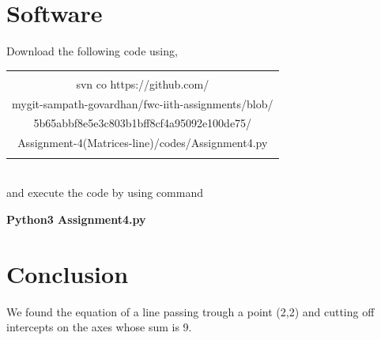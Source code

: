 \documentclass[journal,12pt,twocolumn]{IEEEtran}
\begin{document}
\section{Software}
Download the following code using,
\begin{table}[h]
    \centering
    \begin{tabular}{|c|}
    \hline \\
         svn co https://github.com/\\mygit-sampath-govardhan/fwc-iith-assignments/blob/\\5b65abbf8e5e3c803b1bff8cf4a95092e100de75/\\Assignment-4(Matrices-line)/codes/Assignment4.py  \\
         \\
   \hline
    \end{tabular}
\end{table}
\\
and execute the code by using command
\begin{center}
\textbf{Python3  Assignment4.py}\\
\end{center}

\section{Conclusion}
We found the equation of a line passing trough a point
(2,2) and cutting off intercepts on the axes whose
sum is 9.
\end{document}
